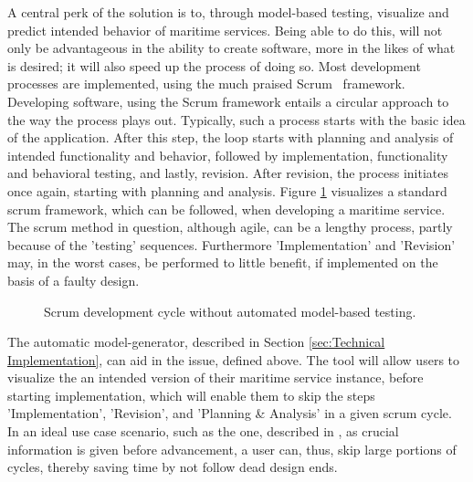 A central perk of the solution is to, through model-based testing, visualize and predict intended behavior of maritime services. Being able to do this, will not only be advantageous in the ability to create software, more in the likes of what is desired; it will also speed up the process of doing so. Most development processes are implemented, using the much praised Scrum~\cite{scrum} framework. Developing software, using the Scrum framework entails a circular approach to the way the process plays out. Typically, such a process starts with the basic idea of the application. After this step, the loop starts with planning and analysis of intended functionality and behavior, followed by implementation, functionality and behavioral testing, and lastly, revision. After revision, the process initiates once again, starting with planning and analysis.
\newpage
\noindent
Figure \ref{fig:scrumBig} visualizes a standard scrum framework, which can be followed, when developing a maritime service. The scrum method in question, although agile, can be a lengthy process, partly because of the 'testing' sequences. Furthermore 'Implementation' and 'Revision' may, in the worst cases, be performed to little benefit, if implemented on the basis of a faulty design.
\begin{figure}[h]
  \centering
  \caption{Scrum development cycle without automated model-based testing.}
  \label{fig:scrumBig}
\end{figure}

The automatic model-generator, described in Section \ref{sec:Technical Implementation}, can aid in the issue, defined above. The tool will allow users to visualize the an intended version of their maritime service instance, before starting implementation, which will enable them to skip the steps 'Implementation', 'Revision', and 'Planning \& Analysis' in a given scrum cycle. In an ideal use case scenario, such as the one, described in %
, as crucial information is given before advancement, a user can, thus, skip large portions of cycles, thereby saving time by not follow dead design ends.

